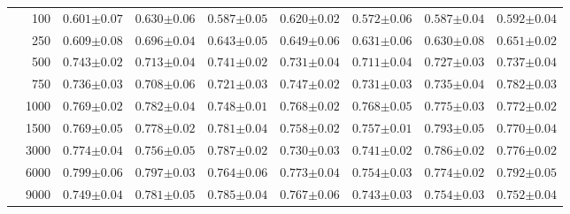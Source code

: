 \begin{landscape}
\begin{table}[p]
\begin{tabular}{cr| *{7}{C{2cm}}}
         & 100 & $0.601{\scriptscriptstyle\pm0.07}$ & $0.630{\scriptscriptstyle\pm0.06}$ & $0.587{\scriptscriptstyle\pm0.05}$ & $0.620{\scriptscriptstyle\pm0.02}$ & $0.572{\scriptscriptstyle\pm0.06}$ & $0.587{\scriptscriptstyle\pm0.04}$ & $0.592{\scriptscriptstyle\pm0.04}$ \\
         & 250 & $0.609{\scriptscriptstyle\pm0.08}$ & $0.696{\scriptscriptstyle\pm0.04}$ & $0.643{\scriptscriptstyle\pm0.05}$ & $0.649{\scriptscriptstyle\pm0.06}$ & $0.631{\scriptscriptstyle\pm0.06}$ & $0.630{\scriptscriptstyle\pm0.08}$ & $0.651{\scriptscriptstyle\pm0.02}$ \\
         & 500   & $0.743{\scriptscriptstyle\pm0.02}$ & $0.713{\scriptscriptstyle\pm0.04}$ & $0.741{\scriptscriptstyle\pm0.02}$ & $0.731{\scriptscriptstyle\pm0.04}$ & $0.711{\scriptscriptstyle\pm0.04}$ & $0.727{\scriptscriptstyle\pm0.03}$ & $0.737{\scriptscriptstyle\pm0.04}$ \\
         & 750  & $0.736{\scriptscriptstyle\pm0.03}$ & $0.708{\scriptscriptstyle\pm0.06}$ & $0.721{\scriptscriptstyle\pm0.03}$ & $0.747{\scriptscriptstyle\pm0.02}$ & $0.731{\scriptscriptstyle\pm0.03}$ & $0.735{\scriptscriptstyle\pm0.04}$ & $0.782{\scriptscriptstyle\pm0.03}$ \\
         & 1000 & $0.769{\scriptscriptstyle\pm0.02}$ & $0.782{\scriptscriptstyle\pm0.04}$ & $0.748{\scriptscriptstyle\pm0.01}$ & $0.768{\scriptscriptstyle\pm0.02}$ & $0.768{\scriptscriptstyle\pm0.05}$ & $0.775{\scriptscriptstyle\pm0.03}$ & $0.772{\scriptscriptstyle\pm0.02}$ \\
         & 1500  & $0.769{\scriptscriptstyle\pm0.05}$ & $0.778{\scriptscriptstyle\pm0.02}$ & $0.781{\scriptscriptstyle\pm0.04}$ & $0.758{\scriptscriptstyle\pm0.02}$ & $0.757{\scriptscriptstyle\pm0.01}$ & $0.793{\scriptscriptstyle\pm0.05}$ & $0.770{\scriptscriptstyle\pm0.04}$ \\
         & 3000  & $0.774{\scriptscriptstyle\pm0.04}$ & $0.756{\scriptscriptstyle\pm0.05}$ & $0.787{\scriptscriptstyle\pm0.02}$ & $0.730{\scriptscriptstyle\pm0.03}$ & $0.741{\scriptscriptstyle\pm0.02}$ & $0.786{\scriptscriptstyle\pm0.02}$ & $0.776{\scriptscriptstyle\pm0.02}$ \\
         & 6000  & $0.799{\scriptscriptstyle\pm0.06}$ & $0.797{\scriptscriptstyle\pm0.03}$ & $0.764{\scriptscriptstyle\pm0.06}$ & $0.773{\scriptscriptstyle\pm0.04}$ & $0.754{\scriptscriptstyle\pm0.03}$ & $0.774{\scriptscriptstyle\pm0.02}$ & $0.792{\scriptscriptstyle\pm0.05}$ \\
         & 9000  & $0.749{\scriptscriptstyle\pm0.04}$ & $0.781{\scriptscriptstyle\pm0.05}$ & $0.785{\scriptscriptstyle\pm0.04}$ & $0.767{\scriptscriptstyle\pm0.06}$ & $0.743{\scriptscriptstyle\pm0.03}$ & $0.754{\scriptscriptstyle\pm0.03}$ & $0.752{\scriptscriptstyle\pm0.04}$ \\

\end{tabular}
\end{table}
\end{landscape}
